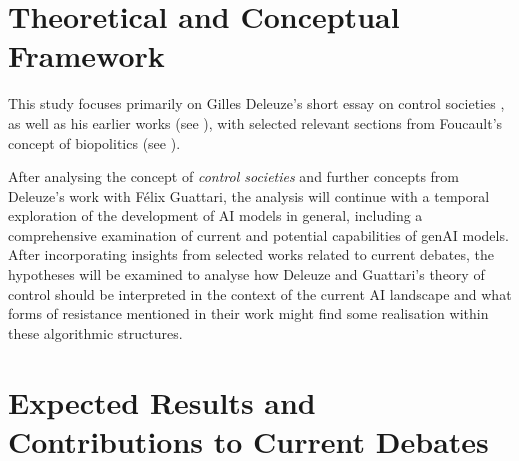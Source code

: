



\section{Theoretical and Conceptual Framework}
This study focuses primarily on Gilles Deleuze's short essay on
control societies \parencite[]{deleuze1992a}, as well as his earlier works (see
\cite{deleuze1983, deleuze1987}), with selected relevant sections from
Foucault's concept of biopolitics (see \cite{foucault2008a, foucault1988}).

After analysing the concept of \textit{control societies} and further concepts from Deleuze’s work with Félix Guattari, the analysis will continue with a temporal exploration of the development of AI models in general, including a comprehensive examination of current and potential capabilities of genAI models. After incorporating insights from selected works related to current debates, the hypotheses will be examined to analyse how Deleuze and Guattari’s theory of control should be interpreted in the context of the current AI landscape and what forms of resistance mentioned in their work might find some realisation within these algorithmic structures.


\section{Expected Results and Contributions to Current Debates}

